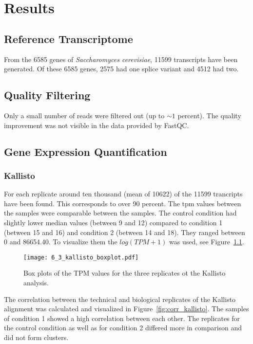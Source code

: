 \chapter{Results}

\section{Reference Transcriptome}

From the 6585 genes of \textit{Saccharomyces cerevisiae}, 11599 transcripts have been generated. 
Of these 6585 genes, 2575 had one splice variant and 4512 had two.

\section{Quality Filtering}

Only a small number of reads were filtered out (up to $\sim 1$ percent).
The quality improvement was not visible in the data provided by 
FastQC.

\section{Gene Expression Quantification}
\subsection{Kallisto}
For each replicate around ten thousand (mean of 10622) of the 11599 trancripts have 
been found. This corresponds to over 90 percent. The \gls{tpm} values between the samples were comparable
between the samples. The control condition had slightly lower median values (between 9 and 12) compared to 
condition 1 (between 15 and 16) and condition 2 (between 14 and 18). 
They ranged between 0 and 86654.40. To visualize them the $log(TPM+1)$ was used, see
Figure~\ref{fig:box_kallisto}.

\begin{figure}[H]
  \center
  \texttt{[image: 6\_3\_kallisto\_boxplot.pdf]}
  \caption{Box plots of the TPM values for the three replicates ot the Kallisto analysis.}\label{fig:box_kallisto}
\end{figure}

The correlation between the technical and biological replicates of the Kallisto 
alignment was calculated and visualized in 
Figure~\ref{fig:corr_kallisto}.
The samples of condition 1 showed a high correlation between each other. The replicates for 
the control condition as well as for condition 2 differed more in comparison and did not 
form clusters. 

